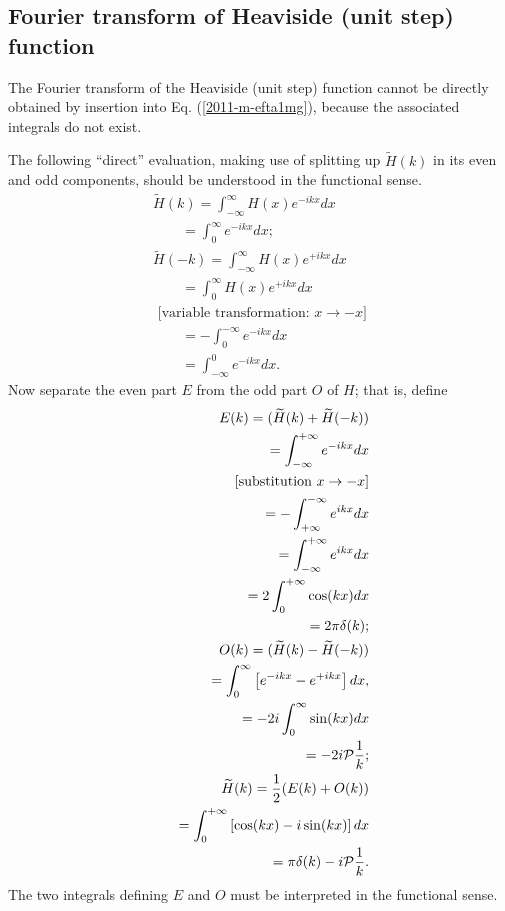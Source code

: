 \subsection{Fourier transform  of  Heaviside (unit step) function}

The Fourier transform of the Heaviside (unit step) function
cannot be directly obtained by insertion into Eq. (\ref{2011-m-efta1mg}), because the associated integrals do not exist.

{\color{OliveGreen}
\bproof
The following ``direct'' evaluation, making use of splitting up $\widetilde{H}(k)$ in its even and odd components,
should be understood in the  functional sense.
\begin{equation}
\begin{split}
 \widetilde{H}(k)
=   \int_{-\infty}^\infty  H(x) e^{-i{kx}} dx   \\
\qquad
=   \int_{0}^\infty   e^{-i{kx}} dx
;   \\
 \widetilde{H}(-k)
=   \int_{-\infty}^\infty  H(x) e^{+i{kx}} dx   \\
\qquad
=   \int_{0}^\infty  H(x) e^{+i{kx}} dx   \\
\textrm{ [variable transformation: }x\rightarrow -x \textrm{]}  \\
\qquad
=  - \int_0^{-\infty} e^{-i{kx}} dx   \\
\qquad
=   \int_{-\infty}^0 e^{-i{kx}} dx
.
\end{split}
\end{equation}
Now separate the even part $E$ from the odd part $O$ of $H$; that is, define
\begin{equation}
\begin{split}
E(k) = (\widetilde{H}(k) + \widetilde{H}(-k))\\
\qquad =   \int_{-\infty}^{+\infty} e^{-i{kx}} dx      \\
\qquad \; [\textrm{substitution } x\rightarrow -x]\\
\qquad =   -\int_{+\infty}^{-\infty} e^{ i{kx}} dx      \\
\qquad =    \int_{-\infty}^{+\infty} e^{ i{kx}} dx      \\
\qquad =    2\int_{0}^{+\infty} \cos (kx) dx      \\
\qquad =   2\pi \delta(k);      \\
O(k) = (\widetilde{H}(k) - \widetilde{H}(-k))\\
\qquad =   \int_{0}^\infty \left[  e^{-i{kx}}- e^{+i{kx}}\right]  dx ,   \\
\qquad =   -2 i \int_{0}^\infty \sin (kx)  dx    \\
\qquad =   - 2 i {\cal P} \frac{1}{k} ;    \\
\widetilde{H}(k) = \frac{1}{2}(E(k)+O(k)) \\
\qquad =     \int_{0}^{+\infty} \left[ \cos (kx) - i\sin (kx) \right] dx  \\
\qquad =    \pi \delta (k) - i{\cal P}\frac{1}{k}
.
\end{split}
\end{equation}
The two integrals defining $E$ and $O$
must be interpreted in the functional sense.




}
